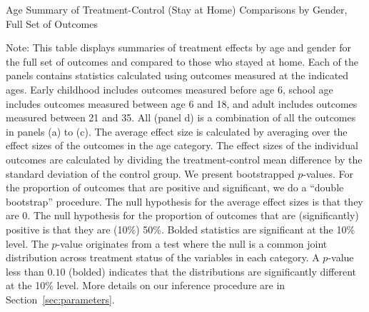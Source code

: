 \begin{table}[h!]
\centering
\begin{threeparttable}
\caption{Age Summary of Treatment-Control (Stay at Home) Comparisons by Gender, Full Set of Outcomes}\label{tab:rosenbaum-table-age-exp-TvCh-big}

\begin{tablenotes}
\item  \tiny Note:  This table displays summaries of treatment effects by age and gender for the full set of outcomes and compared to those who stayed at home. Each of the panels contains statistics calculated using outcomes measured at the indicated ages. Early childhood includes outcomes measured before age 6, school age includes outcomes measured between age 6 and 18, and adult includes outcomes measured between 21 and 35. All (panel d) is a combination of all the outcomes in panels (a) to (c). The average effect size is calculated by averaging over the effect sizes of the outcomes in the age category. The effect sizes of the individual outcomes are calculated by dividing the treatment-control mean difference by the standard deviation of the control group. We present bootstrapped $p$-values. For the proportion of outcomes that are positive and significant, we do a ``double bootstrap'' procedure. The null hypothesis for the average effect sizes is that they are 0. The null hypothesis for the proportion of outcomes that are (significantly) positive is that they are (10\%) 50\%. Bolded statistics are significant at the 10\% level. The \citet{Rosenbaum_2005_Distribution_JRSS} $p$-value originates from a test where the null is a common joint distribution  across treatment status of the variables in each category. A $p$-value less than $0.10$ (bolded) indicates that the distributions are significantly different at the 10\% level. More details on our inference procedure are in Section~\ref{sec:parameters}.
\end{tablenotes}
\end{threeparttable}
\end{table}

